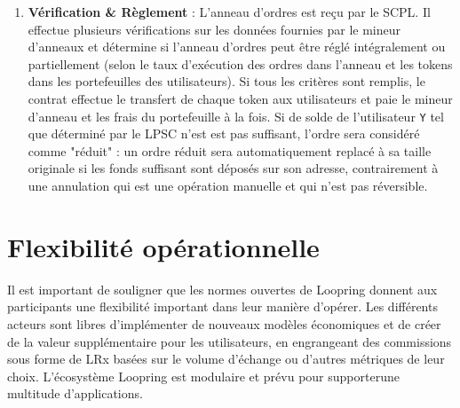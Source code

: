 \documentclass[UTF8,nofonts]{article}
\makeatletter
\newenvironment{figurehere}
 {\def\@captype{figure}}
 {}
\makeatother
\begin{document}
\begin{multicols}{2}
\begin{enumerate}
\item \textbf{Vérification \& Règlement} : L'anneau d'ordres est reçu par le SCPL. Il effectue plusieurs vérifications sur les données fournies par le mineur d'anneaux et détermine si l'anneau d'ordres peut être réglé intégralement ou partiellement (selon le taux d'exécution des ordres dans l'anneau et les tokens dans les portefeuilles des utilisateurs). Si tous les critères sont remplis, le contrat effectue le transfert de chaque token aux utilisateurs et paie le mineur d'anneau et les frais du portefeuille à la fois. Si de solde de l'utilisateur \verb|Y| tel que déterminé par le LPSC n'est est pas suffisant, l'ordre sera considéré comme "réduit" : un ordre réduit sera automatiquement replacé à sa taille originale si les fonds suffisant sont déposés sur son adresse, contrairement à une annulation qui est une opération manuelle et qui n'est pas réversible.


\end{enumerate}





%
%
%

\section{Flexibilité opérationnelle\label{sec:business_model}}
Il est important de souligner que les normes ouvertes de Loopring donnent aux participants une flexibilité important dans leur manière d'opérer. Les différents acteurs sont libres d'implémenter de nouveaux modèles économiques et de créer de la valeur supplémentaire pour les utilisateurs, en engrangeant des commissions sous forme de LRx basées sur le volume d'échange ou d'autres métriques de leur choix. L'écosystème Loopring est modulaire et prévu pour supporterune multitude d'applications.



\end{multicols}
\end{document}

